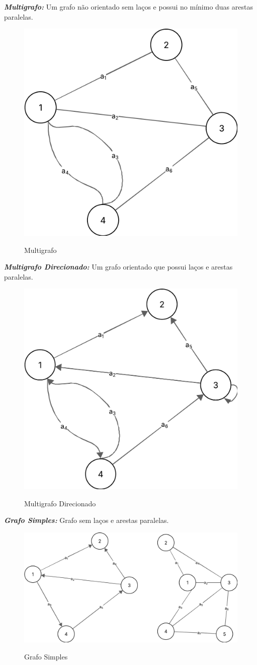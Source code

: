 \textit{\textbf{Multigrafo:}} Um grafo não orientado sem laços e possui no mínimo duas arestas paralelas. \\
\begin{figure} [H]
	\centering
	\caption{Multigrafo}%
	\label{fig:multigraf}%
	\includegraphics[width=0.5\linewidth,angle=0]{figuras/tiposgrafos/multigrafo.png}%
	\\
\end{figure}
\textit{\textbf{Multigrafo Direcionado:}} Um grafo orientado que possui laços e arestas paralelas. \\
\begin{figure} [H]
	\centering
	\caption{Multigrafo Direcionado}%
	\label{fig:multigrafDirec}%
	\includegraphics[width=0.5\linewidth,angle=0]{figuras/tiposgrafos/multigrafoDirec.png}%
	\\
\end{figure}
\textit{\textbf{Grafo Simples:}} Grafo sem laços e arestas paralelas.\\
\begin{figure} [H]
	\centering
	\caption{Grafo Simples}%
	\label{fig:grafSimples}%
	\includegraphics[width=0.7\linewidth,angle=0]{figuras/tiposgrafos/grafoSimples.png}%
	\\
\end{figure}
